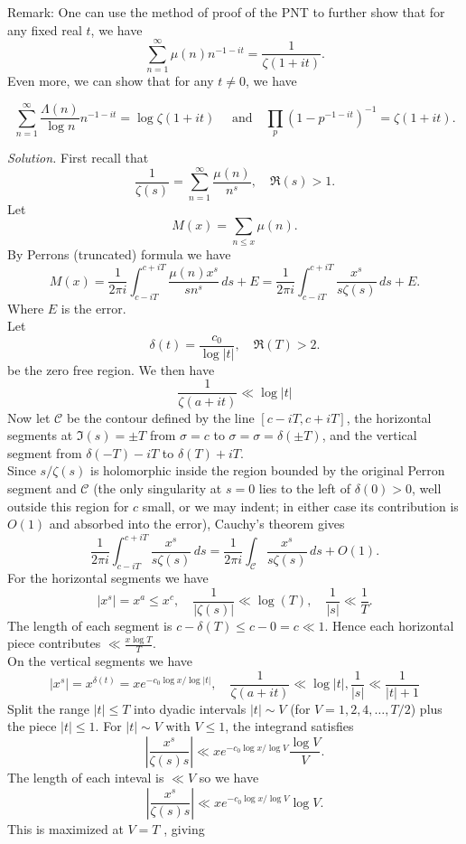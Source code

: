 \documentclass[12pt]{article}
\begin{document}
{\it{Remark: One can use the method of proof of the PNT to further show that for any fixed real $t$, we have
\[
    \sum_{n=1}^{\infty} \mu(n)n^{-1-it}=\frac{1}{\zeta(1+it)}.
\]
Even more, we can show that for any $t\neq 0$, we have

\[
    \sum_{n=1}^{\infty} \frac{\Lambda(n)}{\log n} n^{-1-it}=\log \zeta(1+it)\quad\text{ and}\quad \prod_{p} \left(1-p^{-1-it}\right)^{-1}=\zeta(1+it).
\] 
}}
\textit{Solution.} First recall that
\[
    \frac{1}{\zeta(s)}=\sum_{n=1}^{\infty}\frac{\mu(n)}{n^s},\quad \Re(s)>1.
\]
Let
\[
    M(x)=\sum_{n\leq x}\mu(n).
\]
By Perrons (truncated) formula we have
\[
    M(x)=\frac{1}{2\pi i}\int_{c-iT}^{c+iT}\frac{\mu(n)x^s}{sn^s}\,ds+E=\frac{1}{2\pi i}\int_{c-iT}^{c+iT}\frac{x^s}{s\zeta(s)}\,ds+E.
\]
Where $E$ is the error.\\
Let
\[
    \delta(t)=\frac{c_0}{\log|t|},\quad \Re(T)>2.
\]
be the zero free region.
We then have
\[
    \frac{1}{\zeta(a+it)}\ll\log|t|
\]
Now let $\mathcal{C}$ be the contour defined by the line $[c-iT,c+iT]$, the horizontal segments at $\Im(s) = \pm T$ from $\sigma = c$ to $\sigma = \sigma=\delta(\pm T )$, and the vertical segment from $\delta(-T ) - iT$ to $\delta(T ) + iT$.\\
Since $s/\zeta(s)$ is holomorphic inside the region bounded by the original Perron segment and $\mathcal{C}$ (the only singularity at $s = 0$ lies to the left of $\delta(0) > 0$, well outside this region for $c$ small, or we may indent; in either case its contribution is $O(1)$ and absorbed into the error), Cauchy's theorem gives
\[
    \frac{1}{2\pi i}\int_{c-iT}^{c+iT}\frac{x^s}{s\zeta(s)}\,ds=\frac{1}{2\pi i}\int_{\mathcal{C}}\frac{x^s}{s\zeta(s)}\,ds+O(1).
\]
For the horizontal segments we have
\[
    |x^s|=x^a\leq x^c,\quad\frac{1}{|\zeta(s)|}\ll \log(T),\quad \frac{1}{|s|}\ll\frac{1}{T}.
\]
The length of each segment is $c-\delta(T)\leq c-0=c\ll1$. Hence each horizontal piece contributes $\ll \frac{x\log T}{T}$.\\
On the vertical segments we have
\[
    |x^s|=x^{\delta(t)}=xe^{-c_0\log x/\log|t|},\quad \frac{1}{\zeta(a+it)}\ll\log|t|,\frac{1}{|s|}\ll\frac{1}{|t|+1}
\]
Split the range $|t| \leq T$ into dyadic intervals $|t| \sim V$ (for $V = 1, 2, 4,\dots, T /2$) plus the piece $|t| \leq 1$. For $|t| \sim V$ with $V \leq 1$, the integrand satisfies
\[
    \left|\frac{x^s}{\zeta(s)s}\right|\ll xe^{-c_0\log x/\log V}\frac{\log V}{V}.
\]
The length of each inteval is $\ll V$ so we have
\[
    \left|\frac{x^s}{\zeta(s)s}\right|\ll xe^{-c_0\log x/\log V}\log V.
\]
This is maximized at $V = T$ , giving
\end{document}
